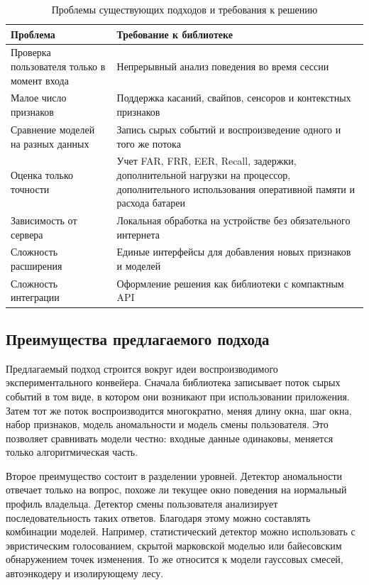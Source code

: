 \documentclass[oneside,senior,etd]{BYUPhys}
\begin{document}
\begin{table}[ht]
\centering
\caption{Проблемы существующих подходов и требования к решению}
\label{tab:problem-requirement}
\begin{tabular}{|p{}|p{}|}
\hline
\textbf{Проблема} & \textbf{Требование к библиотеке} \\
\hline
Проверка пользователя только в момент входа & Непрерывный анализ поведения во время сессии \\
\hline
Малое число признаков & Поддержка касаний, свайпов, сенсоров и контекстных признаков \\
\hline
Сравнение моделей на разных данных & Запись сырых событий и воспроизведение одного и того же потока \\
\hline
Оценка только точности & Учет FAR, FRR, EER, Recall, задержки, дополнительной нагрузки на процессор, дополнительного использования оперативной памяти и расхода батареи \\
\hline
Зависимость от сервера & Локальная обработка на устройстве без обязательного интернета \\
\hline
Сложность расширения & Единые интерфейсы для добавления новых признаков и моделей \\
\hline
Сложность интеграции & Оформление решения как библиотеки с компактным API \\
\hline
\end{tabular}
\end{table}

\subsection{Преимущества предлагаемого подхода}

Предлагаемый подход строится вокруг идеи воспроизводимого экспериментального конвейера. Сначала библиотека записывает поток сырых событий в том виде, в котором они возникают при использовании приложения. Затем тот же поток воспроизводится многократно, меняя длину окна, шаг окна, набор признаков, модель аномальности и модель смены пользователя. Это позволяет сравнивать модели честно: входные данные одинаковы, меняется только алгоритмическая часть.

Второе преимущество состоит в разделении уровней. Детектор аномальности отвечает только на вопрос, похоже ли текущее окно поведения на нормальный профиль владельца. Детектор смены пользователя анализирует последовательность таких ответов. Благодаря этому можно составлять комбинации моделей. Например, статистический детектор можно использовать с эвристическим голосованием, скрытой марковской моделью или байесовским обнаружением точек изменения. То же относится к модели гауссовых смесей, автоэнкодеру и изолирующему лесу.
\end{document}
